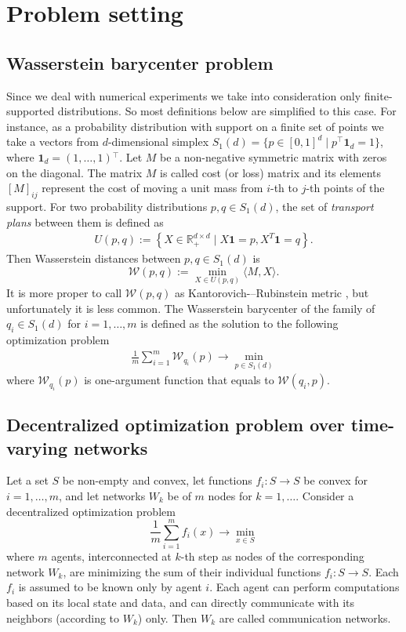 \section{Problem setting}

\subsection{Wasserstein barycenter problem}

Since we deal with numerical experiments we take into consideration only finite-supported distributions. So most definitions below are simplified to this case.  
For instance, as a probability distribution with support on a finite set of points  we take a vectors from $d$-dimensional simplex $S_1(d) =  \{p\in [0,1]^d \mid p\ensuremath{^{\top}} \mathbf{1}_d = 1\}$, where $\mathbf{1}_d = (1,\ldots,1)\ensuremath{^{\top}}$. Let $M$ be a non-negative symmetric matrix with zeros on the diagonal.  The matrix $M$ is called cost (or loss) matrix and its elements $[M]_{ij}$ represent the cost of moving a unit mass from $i$-th to $j$-th points of the support. For two probability distributions $p, q \in S_1(d)$, the set of {\it transport plans} between them is defined as \begin{align*}
		U(p,q)  := \left\lbrace X \in \mathbb{R}_+^{d \times d} \mid X \mathbf{1} = p, X^T\mathbf{1} = q \right\rbrace.
		\end{align*}
Then  Wasserstein distances between $p,q\in S_1(d)$ is \[\mathcal{W} (p,q)  := \min_{X \in U(p,q)}  \langle M, X \rangle. \]
It is more proper to call $\mathcal{W} (p,q)$ as Kantorovich-–Rubinstein metric \cite{vershik2013long}, but unfortunately it is less common.
The Wasserstein barycenter of the family of  $q_i\in S_1(d)$ for $i=1,\ldots,m$ is defined as the solution to the following optimization problem 
{\begin{align}
		\label{w_barycenter}
			 \frac{1}{m}\sum\limits_{i=1}^{m} \mathcal{W}_{q_i}(p) \to \min_{p \in S_1(d)}
\end{align}}
where $\mathcal{W}_{q_i}(p)$ is one-argument function that equals to $\mathcal{W}(q_i,p)$.  

\subsection{Decentralized optimization problem over time-varying networks}

Let a set $S$ be non-empty and convex, let functions $f_i\colon S\to S$  be convex for $i=1,\ldots,m$, and let networks $W_k$ be of $m$ nodes for $k=1,\ldots$. Consider a decentralized optimization problem 
\[\frac{1}{m}\sum\limits_{i=1}^m f_i(x) \to \min\limits_{x\in S}\] 
where $m$  agents, interconnected at $k$-th step as nodes of the corresponding network $W_k$, are minimizing the sum of their individual functions $f_i\colon S\to S$. Each $f_i$ is assumed to be known only by agent $i$.  Each agent can perform computations based on its local state and data, and can directly communicate with its neighbors (according to $W_k$) only. Then $W_k$ are called communication networks.


